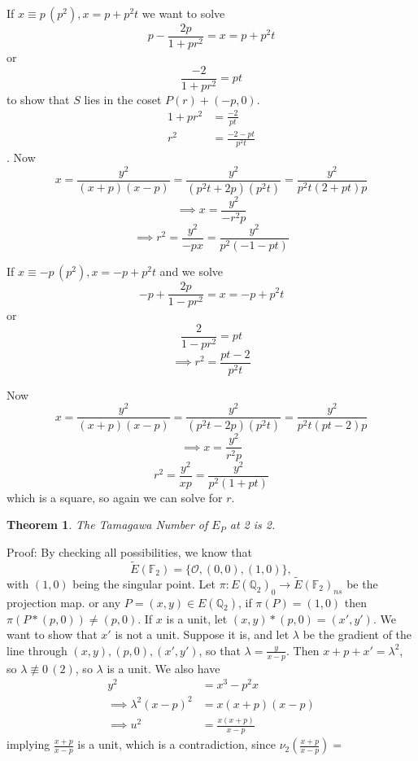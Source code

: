 \documentclass[11pt,a4paper]{amsart}
\theoremstyle{plain}
\newtheorem{thm}[prop]{Theorem}
\theoremstyle{definition}
\theoremstyle{remark}
\numberwithin{equation}{section}
\newcommand{\QQ}{{\mathbb Q}}
\newcommand{\OO}{{\mathcal O}}
\newcommand{\FF}{{\mathbb F}}
\newcommand{\EFt}{{\tilde{E}(\FF_2)}}
\newcommand{\1}{{\mathds 1}}
\begin{document}
If $x \equiv p \, (p^2), x = p + p^2t$ we want to solve
\[p - \frac{2p}{1+pr^2} = x = p + p^2t \] or
\[ \frac{-2}{1+pr^2} = pt\]
to show that $S$ lies in the coset $P(r)+(-p,0)$.
\begin{equation*}
  \begin{split}
    1+pr^2 &= \frac{-2}{pt} \\
    r^2 &= \frac{-2-pt}{p^2t}
  \end{split}
\end{equation*}.
Now
\[ x = \frac{y^2}{(x+p)(x-p)} = \frac{y^2}{(p^2t+2p)(p^2t)}
= \frac{y^2}{p^2t(2+pt)p}\]
\[ \implies x = \frac{y^2}{-r^2 p}\]
\[ \implies r^2 = \frac{y^2}{-px} = \frac{y^2}{p^2(-1-pt)}\]


If $x \equiv -p \, (p^2), x = -p + p^2t$ and we solve
\[ -p + \frac{2p}{1-pr^2} = x = -p + p^2t\] or
\[ \frac{2}{1-pr^2} = pt\]
\[ \implies r^2 = \frac{pt - 2}{p^2t}\]

Now
\[ x = \frac{y^2}{(x+p)(x-p)} = \frac{y^2}{(p^2t-2p)(p^2t)}
= \frac{y^2}{p^2t(pt-2)p}\]
\[\implies x = \frac{y^2}{r^2p}\]
\[ r^2 = \frac{y^2}{xp} = \frac{y^2}{p^2(1+pt)}\]
which is a square, so again we can solve for $r$.

\begin{thm}
  The Tamagawa Number of $E_P$ at 2 is 2.
\end{thm}
Proof: By checking all possibilities, we know that
\[\EFt = \{\OO, (0,0), (1,0)\},\]
with $(1,0)$ being the singular point. Let $\pi : E(\QQ_2)_0 \rightarrow
\EFt_{ns}$ be the projection map. 
or any $P = (x,y) \in E(\QQ_2)$, if $\pi(P) = (1,0)$ then $\pi(P * (p,0)) \neq (p,0)$.
If $x$ is a unit, let $(x,y) * (p,0) = (x',y')$. We want to show that $x'$ is
not a unit. Suppose it is, and let $\lambda$ be the gradient of the line through
$(x,y), (p,0), (x',y')$, so that $\lambda = \frac{y}{x-p}$.
Then $x + p + x' = \lambda^2$, so $\lambda \not\equiv 0 \, (2)$, so $\lambda$ is
a unit. We also have
\[
  \begin{split}
     y^2 &= x^3 - p^2x \\
     \implies \lambda^2(x-p)^2 &= x (x+p) (x-p) \\
     \implies u^2 &= \frac{x (x+p)}{x-p} 
   \end{split}
\]
implying $\frac{x+p}{x-p}$ is a unit, which is a contradiction, since
$\nu_2(\frac{x+p}{x-p}) = $
\end{document}
